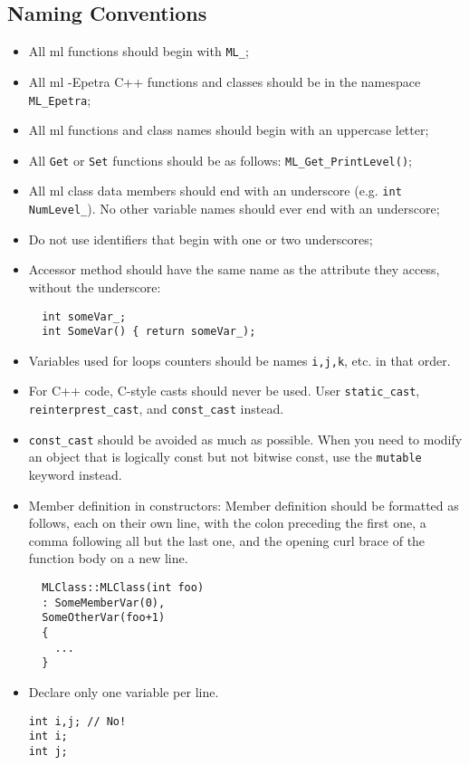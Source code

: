 \documentclass[10pt,letter,relax]{SANDreport}
\newcommand{\ML}     {{\sc ml }}
\begin{document}
\subsection{Naming Conventions}

\begin{itemize}
\item All \ML functions should begin with \verb!ML_!;
\item All \ML-Epetra C++ functions and classes should be in the namespace {\tt
  ML\_Epetra};
\item All \ML functions and class names should begin with an uppercase letter;
\item All \verb!Get! or \verb!Set! functions should be as follows:
\verb!ML_Get_PrintLevel()!;
\item All \ML class data members should end with an underscore (e.g. \verb!int NumLevel_!).
No other variable names should ever end with an underscore;
\item Do not use identifiers that begin with one or two underscores;
\item Accessor method should have the same name as the attribute they access,
  without the underscore:
  \begin{verbatim}
  int someVar_;
  int SomeVar() { return someVar_);
  \end{verbatim}
\item Variables used for loops counters should be names \verb!i,j,k!, etc.
  in that order. 
\item For C++ code, C-style casts should never be used. User
  \verb!static_cast!, \verb!reinterprest_cast!, and \verb!const_cast! instead.
\item \verb!const_cast! should be avoided as much as possible. When you need
to modify an object that is logically const but not bitwise const, use the
\verb!mutable! keyword instead.
\item Member definition in constructors: Member definition should be formatted
  as follows, each on their own line, with the colon preceding the first one,
a comma following all but the last one, and the opening curl brace of the
  function body on a new line.
  \begin{verbatim}
  MLClass::MLClass(int foo)
  : SomeMemberVar(0),
  SomeOtherVar(foo+1)
  {
    ...
  }    
  \end{verbatim}
\item Declare only one variable per line.
\begin{verbatim}
int i,j; // No!
int i;
int j;

\end{verbatim}
\end{itemize}
\end{document}
